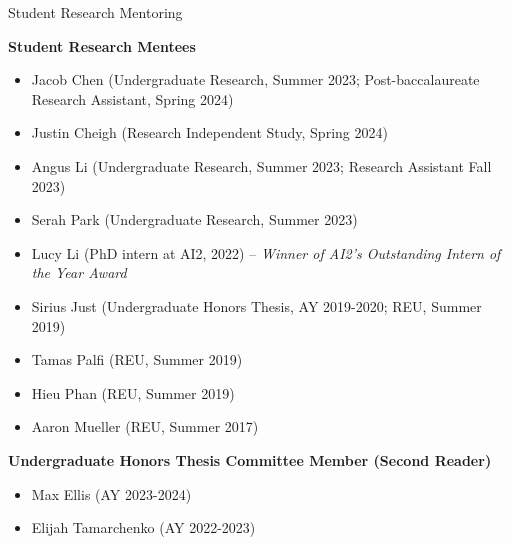 \documentclass{resume} %
\begin{document}

\begin{rSection}{Student Research Mentoring}

\textbf{Student Research Mentees}
\begin{itemize}
    \item Jacob Chen (Undergraduate Research, Summer 2023; Post-baccalaureate Research Assistant, Spring 2024)
\item Justin Cheigh (Research Independent Study, Spring 2024)
\item Angus Li (Undergraduate Research, Summer 2023; Research Assistant Fall 2023)

\item Serah Park (Undergraduate Research, Summer 2023)
\item Lucy Li (PhD intern at AI2, 2022) -- \emph{Winner of AI2's Outstanding Intern of the Year Award}
\item Sirius Just (Undergraduate Honors Thesis, AY 2019-2020; REU, Summer 2019) 
\item Tamas Palfi (REU, Summer 2019) 
\item Hieu Phan (REU, Summer 2019) 
\item Aaron Mueller (REU, Summer 2017) 
\end{itemize}


\textbf{Undergraduate Honors Thesis Committee Member (Second Reader)}

    \begin{itemize}
    \item Max Ellis (AY 2023-2024)
    \item Elijah Tamarchenko (AY 2022-2023)
    \end{itemize}

\end{rSection}
\end{document}
